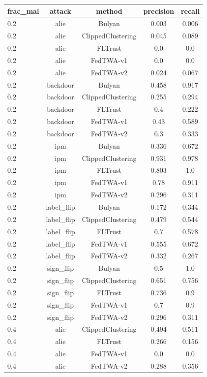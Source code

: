 \begin{tabular}{lcccc}
\toprule
frac\_mal & attack & method & precision & recall \\
\midrule
0.2 & alie & Bulyan & 0.003 & 0.006 \\
0.2 & alie & ClippedClustering & 0.045 & 0.089 \\
0.2 & alie & FLTrust & 0.0 & 0.0 \\
0.2 & alie & FedTWA-v1 & 0.0 & 0.0 \\
0.2 & alie & FedTWA-v2 & 0.024 & 0.067 \\
0.2 & backdoor & Bulyan & 0.458 & 0.917 \\
0.2 & backdoor & ClippedClustering & 0.255 & 0.294 \\
0.2 & backdoor & FLTrust & 0.4 & 0.222 \\
0.2 & backdoor & FedTWA-v1 & 0.43 & 0.589 \\
0.2 & backdoor & FedTWA-v2 & 0.3 & 0.333 \\
0.2 & ipm & Bulyan & 0.336 & 0.672 \\
0.2 & ipm & ClippedClustering & 0.931 & 0.978 \\
0.2 & ipm & FLTrust & 0.803 & 1.0 \\
0.2 & ipm & FedTWA-v1 & 0.78 & 0.911 \\
0.2 & ipm & FedTWA-v2 & 0.296 & 0.311 \\
0.2 & label\_flip & Bulyan & 0.172 & 0.344 \\
0.2 & label\_flip & ClippedClustering & 0.479 & 0.544 \\
0.2 & label\_flip & FLTrust & 0.7 & 0.578 \\
0.2 & label\_flip & FedTWA-v1 & 0.555 & 0.672 \\
0.2 & label\_flip & FedTWA-v2 & 0.332 & 0.267 \\
0.2 & sign\_flip & Bulyan & 0.5 & 1.0 \\
0.2 & sign\_flip & ClippedClustering & 0.651 & 0.756 \\
0.2 & sign\_flip & FLTrust & 0.736 & 0.9 \\
0.2 & sign\_flip & FedTWA-v1 & 0.7 & 0.9 \\
0.2 & sign\_flip & FedTWA-v2 & 0.296 & 0.311 \\
0.4 & alie & ClippedClustering & 0.494 & 0.511 \\
0.4 & alie & FLTrust & 0.266 & 0.156 \\
0.4 & alie & FedTWA-v1 & 0.0 & 0.0 \\
0.4 & alie & FedTWA-v2 & 0.288 & 0.356 \\

\end{tabular}
